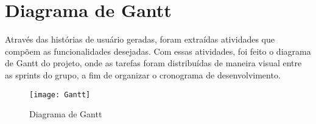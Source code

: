 \section{Diagrama de Gantt}
Através das histórias de usuário geradas, foram extraídas atividades que compõem as funcionalidades desejadas. Com essas atividades, foi feito o diagrama de Gantt do projeto, onde as tarefas foram distribuídas de maneira visual entre as sprints do grupo, a fim de organizar o cronograma de desenvolvimento. 

\begin{figure}[H]
  \centering
  \caption{Diagrama de Gantt}
  \label{fig:gantt}
  \texttt{[image: Gantt]}
\end{figure}
